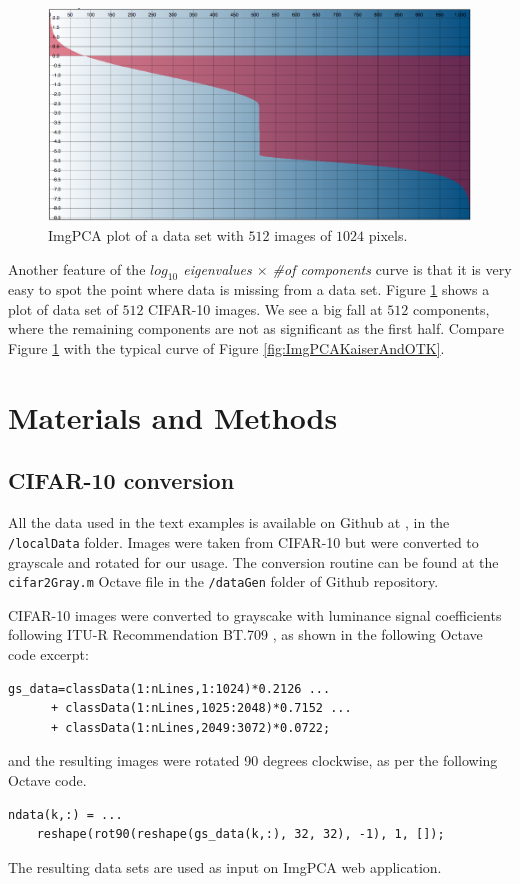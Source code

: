 \documentclass{article} %
\begin{document}
\begin{figure}[h]
\begin{center}
\includegraphics[width=\textwidth]{CIFAR10All512Plot.png}
\end{center}
\caption{ImgPCA plot of a data set with $512$ images of $1024$ pixels.}
\label{fig:ImgPCA512}
\end{figure}

Another feature of the \emph{$log_{10}$ eigenvalues $\times$ \#of components} curve is that it is very easy to spot the point where data is missing from a data set. Figure \ref{fig:ImgPCA512} shows a plot of data set of $512$ CIFAR-10 images. We see a big fall at $512$ components, where the remaining components are not as significant as the first half. Compare Figure \ref{fig:ImgPCA512} with the typical curve of Figure \ref{fig:ImgPCAKaiserAndOTK}.

\section{Materials and Methods}\label{materials}
\subsection{CIFAR-10 conversion}
All the data used in the text examples is available on Github at \citet{Stelling:aa}, in the \texttt{/localData} folder. Images were taken from CIFAR-10 \citep{krizhevsky2009learning} but were converted to grayscale and rotated for our usage. The conversion routine can be found at the \texttt{cifar2Gray.m} Octave file in the \texttt{/dataGen} folder of \citet{Stelling:aa} Github repository.\par

CIFAR-10 images were converted to grayscake with luminance signal coefficients following ITU-R Recommendation BT.709 \citep{ITU-R:2015aa}, as shown in the following Octave code excerpt:
\begin{verbatim}
gs_data=classData(1:nLines,1:1024)*0.2126 ...
      + classData(1:nLines,1025:2048)*0.7152 ...
      + classData(1:nLines,2049:3072)*0.0722;
\end{verbatim}
and the resulting images were rotated 90 degrees clockwise, as per the following Octave code.
\begin{verbatim}
ndata(k,:) = ...
    reshape(rot90(reshape(gs_data(k,:), 32, 32), -1), 1, []);
\end{verbatim}
The resulting data sets are used as input on ImgPCA web application.
\end{document}
